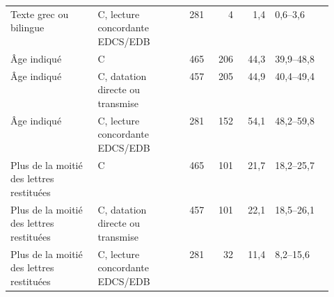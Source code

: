 \begin{longtable}{@{}p{0.27\linewidth} p{0.27\linewidth} r r r l@{}}
Texte grec ou bilingue & C, lecture concordante EDCS/EDB & 281 & 4 & 1,4 & 0,6–3,6 \\
Âge indiqué & C & 465 & 206 & 44,3 & 39,9–48,8 \\
Âge indiqué & C, datation directe ou transmise & 457 & 205 & 44,9 & 40,4–49,4 \\
Âge indiqué & C, lecture concordante EDCS/EDB & 281 & 152 & 54,1 & 48,2–59,8 \\
Plus de la moitié des lettres restituées & C & 465 & 101 & 21,7 & 18,2–25,7 \\
Plus de la moitié des lettres restituées & C, datation directe ou transmise & 457 & 101 & 22,1 & 18,5–26,1 \\
Plus de la moitié des lettres restituées & C, lecture concordante EDCS/EDB & 281 & 32 & 11,4 & 8,2–15,6 \\
\end{longtable}
